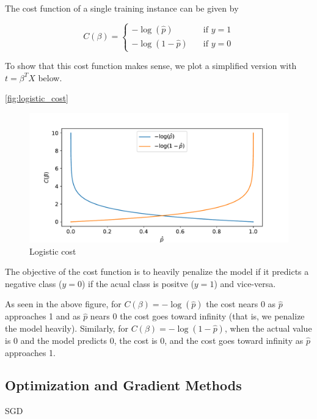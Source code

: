 The cost function of a single training instance can be given by

\begin{equation}
    C(\beta) = \begin{cases} - \log(\hat{p}) &\quad \text{if } y=1 \\ - \log(1-\hat{p}) &\quad \text{if } y=0  \end{cases}
\end{equation}

To show that this cost function makes sense, we plot a simplified version with $t=\beta^T X$ below.

\autoref{fig:logistic_cost}

\begin{figure}[H]
\begin{center}\includegraphics[scale=0.6]{latex/figures/logistic_cost_func.pdf}
\end{center}
\caption{Logistic cost}
\label{fig:logistic_cost}
\end{figure}

The objective of the cost function is to heavily penalize the model if it predicts a negative class ($y=0$) if the acual class is positve ($y=1$) and vice-versa. 

As seen in the above figure, for $C(\beta) = - \log(\hat{p})$ the cost nears 0 as $\hat{p}$ approaches 1 and as $\hat{p}$ nears 0 the cost goes toward infinity (that is, we penalize the model heavily). Similarly, for $C(\beta) = - \log(1 - \hat{p})$, when the actual value is 0 and the model predicts 0, the cost is 0, and the cost goes toward infinity as $\hat{p}$ approaches 1.


\subsection{Optimization and Gradient Methods}\label{sec:optim theory}
SGD

